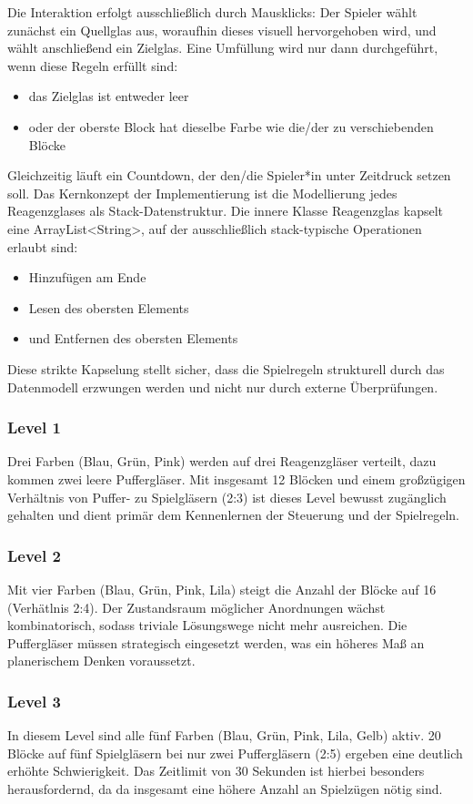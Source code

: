 Die Interaktion erfolgt ausschließlich durch Mausklicks: Der Spieler wählt zunächst ein \glqq{}Quellglas\grqq{} aus, woraufhin dieses visuell hervorgehoben wird, und wählt anschließend ein Zielglas.
Eine Umfüllung wird nur dann durchgeführt, wenn diese Regeln erfüllt sind:
\begin{itemize}
\item das Zielglas ist entweder leer
\item oder der oberste Block hat dieselbe Farbe wie die/der zu verschiebenden Blöcke
\end{itemize}

Gleichzeitig läuft ein Countdown, der den/die Spieler*in unter Zeitdruck setzen soll.
Das Kernkonzept der Implementierung ist die Modellierung jedes Reagenzglases als Stack-Datenstruktur. Die innere Klasse Reagenzglas kapselt eine ArrayList<String>, auf der ausschließlich stack-typische Operationen erlaubt sind:
\begin{itemize}
\item Hinzufügen am Ende
\item Lesen des obersten Elements
\item und Entfernen des obersten Elements
\end{itemize}
Diese strikte Kapselung stellt sicher, dass die Spielregeln strukturell durch das Datenmodell erzwungen werden und nicht nur durch externe Überprüfungen.

\subsubsection{Level 1}

Drei Farben (Blau, Grün, Pink) werden auf drei Reagenzgläser verteilt, dazu kommen zwei leere Puffergläser. Mit insgesamt 12 Blöcken und einem großzügigen Verhältnis von Puffer- zu Spielgläsern (2:3) ist dieses Level bewusst zugänglich gehalten und dient primär dem Kennenlernen der Steuerung und der Spielregeln.

\subsubsection{Level 2}
Mit vier Farben (Blau, Grün, Pink, Lila) steigt die Anzahl der Blöcke auf 16 (Verhätlnis 2:4). Der Zustandsraum möglicher Anordnungen wächst kombinatorisch, sodass triviale Lösungswege nicht mehr ausreichen. Die Puffergläser müssen strategisch eingesetzt werden, was ein höheres Maß an planerischem Denken voraussetzt.

\subsubsection{Level 3}
In diesem Level sind alle fünf Farben (Blau, Grün, Pink, Lila, Gelb) aktiv. 20 Blöcke auf fünf Spielgläsern bei nur zwei Puffergläsern (2:5) ergeben eine deutlich erhöhte Schwierigkeit. Das Zeitlimit von 30 Sekunden ist hierbei besonders herausfordernd, da da insgesamt eine höhere Anzahl an Spielzügen nötig sind.

